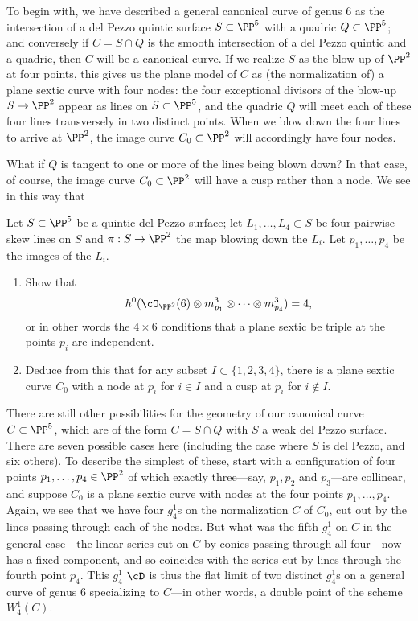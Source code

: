 To begin with, we have described a general canonical curve of genus 6 as the intersection of a del Pezzo quintic surface $S \subset \PP^5$ with a quadric $Q \subset \PP^5$; and conversely if $C = S \cap Q$ is the smooth intersection of a del Pezzo quintic and a quadric, then $C$ will be a canonical curve. If we realize $S$ as the blow-up of $\PP^2$ at four points, this gives us the plane model of $C$ as (the normalization of) a plane sextic curve with four nodes: the four exceptional divisors of the blow-up $S \to \PP^2$ appear as lines on $S \subset \PP^5$, and the quadric $Q$ will meet each of these four lines transversely in two distinct points. When we blow down the four lines to arrive at $\PP^2$, the image curve $C_0 \subset \PP^2$ will accordingly have four nodes.

What if $Q$ is tangent to one or more of the lines being blown down? In that case, of course, the image curve $C_0 \subset \PP^2$ will have a cusp rather than a node. We see in this way that 

\begin{exercise}
Let $S \subset \PP^5$ be a quintic del Pezzo surface; let $L_1,\dots,L_4 \subset S$ be four pairwise skew lines on $S$ and $\pi : S \to \PP^2$ the map blowing down the $L_i$. Let $p_1,\dots,p_4 $ be the images of the $L_i$.
\begin{enumerate}
\item Show that 
$$
h^0(\cO_{\PP^2}(6) \otimes m_{p_1}^3 \otimes \dots \otimes m_{p_4}^3) = 4,
$$
or in other words the $4 \times 6$ conditions that a plane sextic be triple at the points $p_i$ are independent.
\item Deduce from this that for any subset $I \subset \{1,2,3,4\}$, there is a plane sextic curve $C_0$ with a node at $p_i$ for $i \in I$ and a cusp at $p_i$ for $i \notin I$.
\end{enumerate}
\end{exercise}

There are still other possibilities for the geometry of our canonical curve $C \subset \PP^5$, which are of the form $C = S \cap Q$ with $S$ a weak del Pezzo surface. There are seven possible cases here (including the case where $S$ is del Pezzo, and six others). To describe the simplest of these, start with a configuration of four points  $p_1,\dots,p_4 \in \PP^2$ of which exactly three---say, $p_1,p_2$ and $p_3$---are collinear, and suppose $C_0$ is a plane sextic curve with nodes at the four points  $p_1,\dots,p_4$. Again, we see that we have four $g^1_4$s on the normalization $C$ of $C_0$, cut out by the lines passing through each of the nodes. But what was the fifth $g^1_4$ on $C$ in the general case---the linear series cut on $C$ by conics passing through all four---now has a fixed component, and so coincides with the series cut by lines through the fourth point $p_4$. This $g^1_4$ $\cD$ is thus the flat limit of two distinct $g^1_4$s on a general curve of genus 6 specializing to $C$---in other words, a double point of the scheme $W^1_4(C)$.

